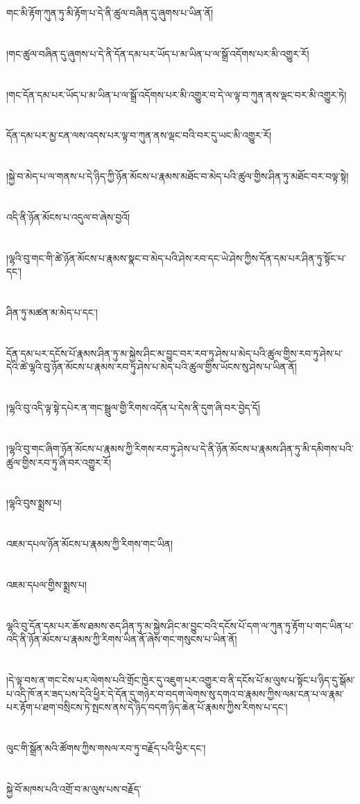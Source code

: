གང་མི་རྟོག་ཀུན་ཏུ་མི་རྟོག་པ་དེ་ནི་ཚུལ་བཞིན་དུ་ཞུགས་པ་ཡིན་ནོ།\chapter{ }།གང་ཚུལ་བཞིན་དུ་ཞུགས་པ་དེ་ནི་དོན་དམ་པར་ཡོད་པ་མ་ཡིན་པ་ལ་སྒྲོ་འདོགས་པར་མི་འགྱུར་རོ།\chapter{ }།གང་དོན་དམ་པར་ཡོད་པ་མ་ཡིན་པ་ལ་སྒྲོ་འདོགས་པར་མི་འགྱུར་བ་དེ་ལ་ལྟ་བ་ཀུན་ནས་ལྡང་བར་མི་འགྱུར་ཏེ།\chapter{ }དོན་དམ་པར་མྱ་ངན་ལས་འདས་པར་ལྟ་བ་ཀུན་ནས་ལྡང་བའི་བར་དུ་ཡང་མི་འགྱུར་རོ།\chapter{ }།སྐྱེ་བ་མེད་པ་ལ་གནས་པ་དེ་ཉིད་ཀྱི་ཉོན་མོངས་པ་རྣམས་མཐོང་བ་མེད་པའི་ཚུལ་གྱིས་ཤིན་ཏུ་མཐོང་བར་བལྟ་སྟེ།\chapter{ }འདི་ནི་ཉོན་མོངས་པ་འདུལ་བ་ཞེས་བྱའོ།\chapter{ }།ལྷའི་བུ་གང་གི་ཚེ་ཉོན་མོངས་པ་རྣམས་སྣང་བ་མེད་པའི་ཤེས་རབ་དང་ཡེ་ཤེས་ཀྱིས་དོན་དམ་པར་ཤིན་ཏུ་སྟོང་པ་དང་།\chapter{ }ཤིན་ཏུ་མཚན་མ་མེད་པ་དང་།\chapter{ }དོན་དམ་པར་དངོས་པོ་རྣམས་ཤིན་ཏུ་མ་སྐྱེས་ཤིང་མ་བྱུང་བར་རབ་ཏུ་ཤེས་པ་མེད་པའི་ཚུལ་གྱིས་རབ་ཏུ་ཤེས་པ་དེའི་ཚེ་ལྷའི་བུ་ཉོན་མོངས་པ་རྣམས་རབ་ཏུ་ཤེས་པ་མེད་པའི་ཚུལ་གྱིས་ཡོངས་སུ་ཤེས་པ་ཡིན་ནོ།\chapter{ }།ལྷའི་བུ་འདི་ལྟ་སྟེ་དཔེར་ན་གང་སྦྲུལ་གྱི་རིགས་འདོན་པ་དེས་ནི་དུག་ཞི་བར་བྱེད་དོ།\chapter{ }།ལྷའི་བུ་གང་ཞིག་ཉོན་མོངས་པ་རྣམས་ཀྱི་རིགས་རབ་ཏུ་ཤེས་པ་དེ་ནི་ཉོན་མོངས་པ་རྣམས་ཤིན་ཏུ་མི་དམིགས་པའི་ཚུལ་གྱིས་རབ་ཏུ་ཞི་བར་འགྱུར་རོ།\chapter{ }།ལྷའི་བུས་སྨྲས་པ།\chapter{ }འཇམ་དཔལ་ཉོན་མོངས་པ་རྣམས་ཀྱི་རིགས་གང་ཡིན།\chapter{ }འཇམ་དཔལ་གྱིས་སྨྲས་པ།\chapter{ }ལྷའི་བུ་དོན་དམ་པར་ཆོས་ཐམས་ཅད་ཤིན་ཏུ་མ་སྐྱེས་ཤིང་མ་བྱུང་བའི་དངོས་པོ་དག་ལ་ཀུན་ཏུ་རྟོག་པ་གང་ཡིན་པ་འདི་ནི་ཉོན་མོངས་པ་རྣམས་ཀྱི་རིགས་ཡིན་ནོ་ཞེས་གང་གསུངས་པ་ཡིན་ནོ།\chapter{ }།དེ་ལྟ་བས་ན་གང་ངེས་པར་ལེགས་པའི་གྲོང་ཁྱེར་དུ་འཇུག་པར་འགྱུར་བ་ནི་དངོས་པོ་མ་ལུས་པ་སྟོང་པ་ཉིད་དུ་སྒོམ་པ་འདི་ཁོ་ནར་ཟད་པས་དེའི་ཕྱིར་དེ་དོན་དུ་གཉེར་བ་བདག་ལེགས་སུ་དགའ་བ་རྣམས་ཀྱིས་ལམ་ངན་པ་ལ་རྣམ་པར་རྟོག་པ་ཐག་བསྲིངས་ཏེ་སྤངས་ནས་དེ་ཉིད་བདག་ཉིད་ཆེན་པོ་རྣམས་ཀྱིས་རིགས་པ་དང་།\chapter{ }ལུང་གི་སྒྲོན་མའི་ཚོགས་ཀྱིས་གསལ་རབ་ཏུ་བརྗོད་པའི་ཕྱིར་དང་།\chapter{ }སྐྱེ་བོ་མཁས་པའི་འགྲོ་བ་མ་ལུས་པས་བརྗོད་